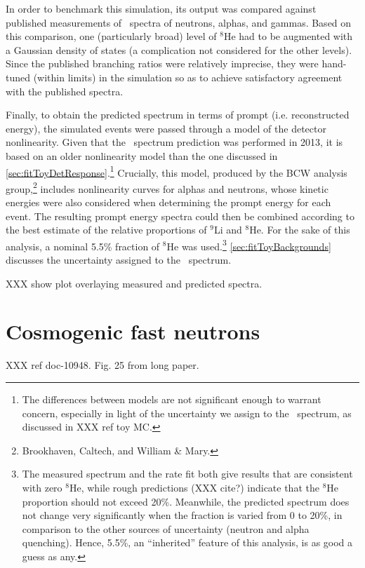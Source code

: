 \documentclass[../thesis.tex]{subfiles}
\begin{document}
In order to benchmark this simulation, its output was compared against published measurements of \LiHe\ spectra of neutrons, alphas, and gammas. Based on this comparison, one (particularly broad) level of $^8$He had to be augmented with a Gaussian density of states (a complication not considered for the other levels). Since the published branching ratios were relatively imprecise, they were hand-tuned (within limits) in the simulation so as to achieve satisfactory agreement with the published spectra.

Finally, to obtain the predicted spectrum in terms of prompt (i.e. reconstructed energy), the simulated events were passed through a model of the detector nonlinearity. Given that the \LiHe\ spectrum prediction was performed in 2013, it is based on an older nonlinearity model than the one discussed in \autoref{sec:fitToyDetResponse}.\footnote{The differences between models are not significant enough to warrant concern, especially in light of the uncertainty we assign to the \LiHe\ spectrum, as discussed in XXX ref toy MC.} Crucially, this model, produced by the BCW analysis group,\footnote{Brookhaven, Caltech, and William \& Mary.} includes nonlinearity curves for alphas and neutrons, whose kinetic energies were also considered when determining the prompt energy for each event. The resulting prompt energy spectra could then be combined according to the best estimate of the relative proportions of $^9$Li and $^8$He. For the sake of this analysis, a nominal 5.5\% fraction of $^8$He was used.\footnote{The measured spectrum and the rate fit both give results that are consistent with zero $^8$He, while rough predictions (XXX cite?) indicate that the $^8$He proportion should not exceed 20\%. Meanwhile, the predicted spectrum does not change very significantly when the fraction is varied from 0 to 20\%, in comparison to the other sources of uncertainty (neutron and alpha quenching). Hence, 5.5\%, an ``inherited'' feature of this analysis, is as good a guess as any.} \autoref{sec:fitToyBackgrounds} discusses the uncertainty assigned to the \LiHe\ spectrum.

XXX show plot overlaying measured and predicted spectra.

\section{Cosmogenic fast neutrons}
\label{sec:bkgFastn}

XXX ref doc-10948. Fig. 25 from long paper.
\end{document}
